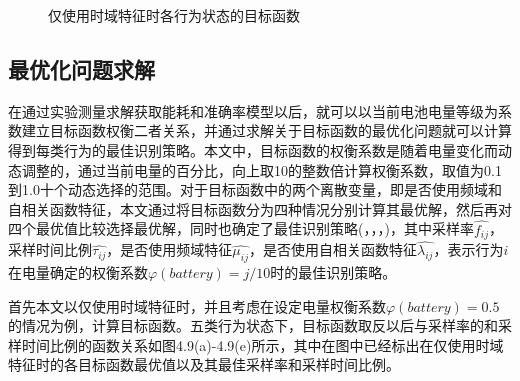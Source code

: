 \begin{figure}[!htb]
    \centering
    \caption{仅使用时域特征时各行为状态的目标函数}
\end{figure}


\subsection{最优化问题求解}
\par 在通过实验测量求解获取能耗和准确率模型以后，就可以以当前电池电量等级为系数建立目标函数权衡二者关系，并通过求解关于目标函数的最优化问题就可以计算得到每类行为的最佳识别策略。本文中，目标函数的权衡系数是随着电量变化而动态调整的，通过当前电量的百分比，向上取10的整数倍计算权衡系数，取值为0.1到1.0十个动态选择的范围。对于目标函数中的两个离散变量，即是否使用频域和自相关函数特征，本文通过将目标函数分为四种情况分别计算其最优解，然后再对四个最优值比较选择最优解，同时也确定了最佳识别策略(，\bm{$\widehat{\tau}$}，\bm{$\widehat{\mu}$}，\bm{$\widehat{\lambda}$})，其中采样率$\widehat{f_{ij}}$，采样时间比例$\widehat{\tau_{ij}}$，是否使用频域特征$\widehat{\mu_{ij}}$，是否使用自相关函数特征$\widehat{\lambda_{ij}}$，表示行为$i$在电量确定的权衡系数$\varphi (battery) = j/10$时的最佳识别策略。

\par 首先本文以仅使用时域特征时，并且考虑在设定电量权衡系数$\varphi (battery) = 0.5$的情况为例，计算目标函数。五类行为状态下，目标函数取反以后与采样率的和采样时间比例的函数关系如图4.9(a)-4.9(e)所示，其中在图中已经标出在仅使用时域特征时的各目标函数最优值以及其最佳采样率和采样时间比例。




